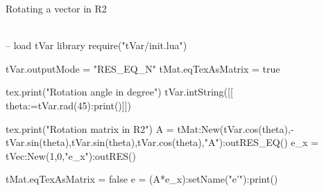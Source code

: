 \documentclass{article}
\begin{document}
Rotating a vector in R2 \\\\
\begin{luacode}
	-- load tVar library
	require("tVar/init.lua")
	
	tVar.outputMode = "RES_EQ_N"
	tMat.eqTexAsMatrix = true
	
	tex.print("Rotation angle in degree")
	tVar.intString([[\\theta:=tVar.rad(45):print()]])

	tex.print("Rotation matrix in R2")
	A = tMat:New({{tVar.cos(theta),-tVar.sin(theta)},{tVar.sin(theta),tVar.cos(theta)}},"A"):outRES_EQ()
	e_x = tVec:New({1,0},"e_x"):outRES()
	
	
	tMat.eqTexAsMatrix = false
	e = (A*e_x):setName("e'"):print()
\end{luacode}
\end{document}
